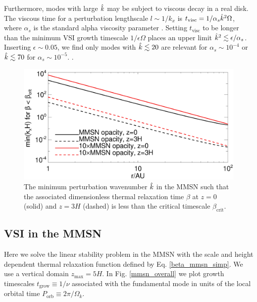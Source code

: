 Furthermore, modes with large $\hat{k}$ may be subject to viscous decay
in a real disk. The viscous time for a perturbation lengthscale
$l\sim 1/k_x$ is $t_\mathrm{visc} = 1/\alpha_s\hat{k}^2\Omega $, where
$\alpha_s$ is the standard alpha viscosity parameter
\citep{shakura73}. Setting $t_\mathrm{visc}$ to be longer than the
minimum VSI growth timescale $1/\epsilon\Omega$ places an upper limit
$\hat{k}^2\lesssim \epsilon/\alpha_s$. Inserting $\epsilon \sim 0.05$,
we find only modes with $\hat{k}\lesssim 20$ are relevant for
$\alpha_s\sim 10^{-4}$ or $\hat{k}\lesssim 70$ for $\alpha_s\sim
10^{-5}$. \citep[These low viscosity levels are required for the
VSI, see][]{nelson13}.



\begin{figure}
  \includegraphics[width=\linewidth]{figures/bcrit_mink} 
  \caption{The minimum perturbation wavenumber $\hat{k}$ in
    the MMSN such that the associated dimensionless thermal
    relaxation time  $\beta$ at $z=0$ (solid) and $z=3H$ (dashed) is
    less than the critical timescale $\beta_\mathrm{crit}$.   
    \label{mmsn_bcrit_bcool_mink}}   
\end{figure}  


\subsection{VSI in the MMSN}
Here we solve the linear stability problem in the MMSN with the scale and
height dependent thermal relaxation function defined by
Eq. \ref{beta_mmsn_simp}.  We use a vertical
domain $z_\mathrm{max}=5H$. In Fig. \ref{mmsn_overall} we plot growth
timescales $t_\mathrm{grow} \equiv 1/\nu$ associated with the
fundamental mode in units of the local orbital time
$P_\mathrm{orb}\equiv 2\pi/\Omega_k$.    


